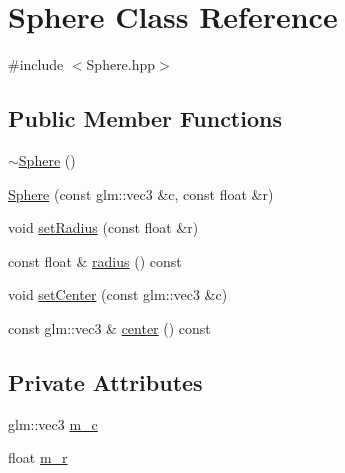 \hypertarget{classSphere}{\section{Sphere Class Reference}
\label{classSphere}
}


{\ttfamily \#include $<$Sphere.\+hpp$>$}

\subsection*{Public Member Functions}
\begin{DoxyCompactItemize}
\item 
\hyperlink{classSphere_a569c071e50a3e11f678630ee1a17737e}{$\sim$\+Sphere} ()
\item 
\hyperlink{classSphere_ac424b7c664475efad29d49626b48e74f}{Sphere} (const glm\+::vec3 \&c, const float \&r)
\item 
void \hyperlink{classSphere_a17e5210c691fdb36d2c7cefe063f7a51}{set\+Radius} (const float \&r)
\item 
const float \& \hyperlink{classSphere_a4b90af2ff375d26ac63e2ed85963b116}{radius} () const 
\item 
void \hyperlink{classSphere_adb1613eba872ced0512204c68263b7f0}{set\+Center} (const glm\+::vec3 \&c)
\item 
const glm\+::vec3 \& \hyperlink{classSphere_a4276557caf9d06f7efdb2dabf656dc61}{center} () const 
\end{DoxyCompactItemize}
\subsection*{Private Attributes}
\begin{DoxyCompactItemize}
\item 
glm\+::vec3 \hyperlink{classSphere_a2fd875d8cdeaef8fd3551fdf3241c7b1}{m\+\_\+c}
\item 
float \hyperlink{classSphere_a2476da8402053c022436054f108bf8aa}{m\+\_\+r}
\end{DoxyCompactItemize}


